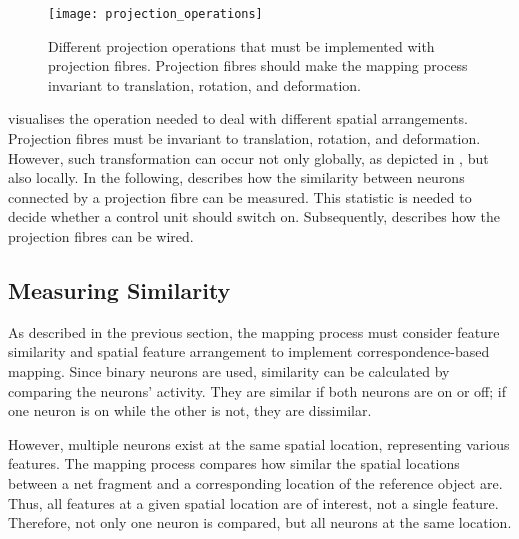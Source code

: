 \begin{figure}[h]
    \centering
    \texttt{[image: projection\_operations]}
    \caption[Different projection operation]{Different projection operations that must be implemented with projection fibres. Projection fibres should make the mapping process invariant to translation, rotation, and deformation.}
\end{figure}
 visualises the operation needed to deal with different spatial arrangements.
Projection fibres must be invariant to translation, rotation, and deformation. However, such transformation can occur not only globally, as depicted in , but also locally.
In the following,  describes how the similarity between neurons connected by a projection fibre can be measured. This statistic is needed to decide whether a control unit should switch on. Subsequently,  describes how the projection fibres can be wired.

\subsection{Measuring Similarity}
As described in the previous section, the mapping process must consider feature similarity and spatial feature arrangement to implement correspondence-based mapping.
Since binary neurons are used, similarity can be calculated by comparing the neurons' activity. They are similar if both neurons are on or off; if one neuron is on while the other is not, they are dissimilar.

However, multiple neurons exist at the same spatial location, representing various features.
The mapping process compares how similar the spatial locations between a net fragment and a corresponding location of the reference object are.
Thus, all features at a given spatial location are of interest, not a single feature. Therefore, not only one neuron is compared, but all neurons at the same location.

